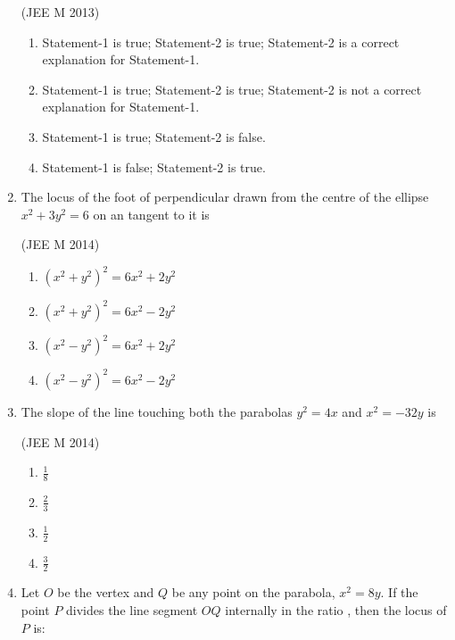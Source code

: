 \begin{enumerate}
\hfill(JEE M 2013)
\begin{enumerate}
    \item Statement-1 is true; Statement-2 is true; Statement-2 is a correct explanation for Statement-1.
    \item Statement-1 is true; Statement-2 is true; Statement-2 is not a correct explanation for Statement-1.
    \item Statement-1 is true; Statement-2 is false.
    \item Statement-1 is false; Statement-2 is true.
\end{enumerate}
\item The locus of the foot of perpendicular drawn from the centre of the ellipse $x^2+3y^2=6$ on an tangent to it is

\hfill(JEE M 2014)
\begin{enumerate}
    \item $(x^2+y^2)^2=6x^2+2y^2$
    \item $(x^2+y^2)^2=6x^2-2y^2$
    \item $(x^2-y^2)^2=6x^2+2y^2$
    \item $(x^2-y^2)^2=6x^2-2y^2$
\end{enumerate}
\item The slope of the line touching both the parabolas $y^2=4x$ and $x^2=-32y$ is

\hfill(JEE M 2014)
\begin{enumerate}
    \item $\frac{1}{8}$
    \item $\frac{2}{3}$
    \item $\frac{1}{2}$
    \item $\frac{3}{2}$
\end{enumerate}
\item Let $O$ be the vertex and $Q$ be any point on the parabola, $x^2=8y$. If the point $P$ divides the line segment $OQ$ internally in the ratio , then the locus of $P$ is:


\end{enumerate}
